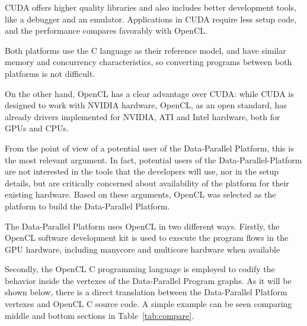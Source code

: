 \documentclass[conference]{IEEEtran}
\begin{document}
CUDA offers higher quality libraries and also includes better development tools,
like a debugger and an emulator.  Applications in CUDA require less setup code,
and the performance compares favorably with
OpenCL\cite{DBLP:journals/corr/abs-1005-2581}.

Both platforms use the C language as their reference model, and have similar
memory and concurrency characteristics, so converting programs between both
platforms is not difficult.

On the other hand, OpenCL has a clear advantage over CUDA: while CUDA is
designed to work with NVIDIA hardware, OpenCL, as an open standard, has already
drivers implemented for NVIDIA, ATI and Intel hardware, both for GPUs and CPUs.

From the point of view of a potential user of the Data-Parallel Platform, this
is the most relevant argument. In fact, potential users of the
Data-Parallel-Platform are not interested in the tools that the developers will
use, nor in the setup details, but are critically concerned about availability
of the platform for their existing hardware.  Based on these arguments, OpenCL
was selected as the platform to build the Data-Parallel Platform.


The Data-Parallel Platform uses OpenCL in two different ways.  Firstly, the
OpenCL software development kit is used to execute the program flows in the GPU
hardware, including manycore and multicore hardware when available



Secondly, the OpenCL C programming language is employed to codify the behavior
inside the vertexes of the Data-Parallel Program graphs.  As it will be shown
below, there is a direct translation between the Data-Parallel Platform vertexes
and OpenCL C source code. A simple example can be seen comparing middle and
bottom sections in Table~\ref{tab:compare}.
\end{document}
